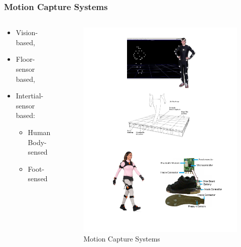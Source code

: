 \documentclass{beamer}
\theoremstyle{definition}
\begin{document}
\begin{frame}
\frametitle{Motion Capture Systems}

\begin{columns}[onlytextwidth]
\begin{column}{0.5\textwidth}
\begin{itemize}
 \item Vision-based,
 \item Floor-sensor based, 
 \item Intertial-sensor based:
 \begin{itemize}
  \item Human Body-sensed
  \item Foot-sensed
 \end{itemize}
\end{itemize}
\end{column} 
\begin{column}{0.5\textwidth}
\begin{figure}
\includegraphics[scale=0.25]{motioncapturesystems}
\centering 
\caption{Motion Capture Systems}
\end{figure}
    \end{column}
\end{columns}
\end{frame}
\end{document}
